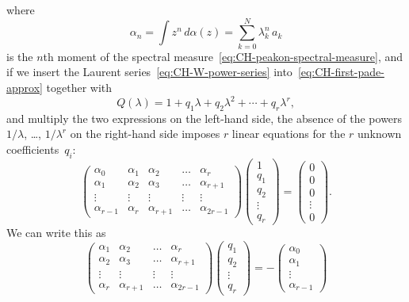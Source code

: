 \documentclass[10pt,a4paper]{article} \pdfoutput=1 
\begin{document}
where
\begin{equation}
  \label{eq:CH-def-moments}
  \alpha_n = \int z^n \, d\alpha(z)
  = \sum_{k=0}^N \lambda_k^n \, a_k
\end{equation}
is the $n$th moment of the spectral measure~\eqref{eq:CH-peakon-spectral-measure},
and if we insert the Laurent series~\eqref{eq:CH-W-power-series}
into~\eqref{eq:CH-first-pade-approx} together with
\begin{equation}
  Q(\lambda) = 1 + q_1 \lambda + q_2 \lambda^2 + \dotsb + q_r \lambda^r
  ,
\end{equation}
and multiply the two expressions on the left-hand side,
the absence of the powers
$1/\lambda$, \ldots, $1/\lambda^r$ on the right-hand side
imposes $r$ linear equations for the $r$ unknown coefficients~$q_i$:
\begin{equation}
  \label{eq:CH-stieltjes-orthogonality-matrix-form}
  \begin{pmatrix}
    \alpha_0 & \alpha_1 & \alpha_2 & \dots & \alpha_r \\
    \alpha_1 & \alpha_2 & \alpha_3 & \dots & \alpha_{r+1} \\
    \vdots & \vdots & \vdots & \vdots & \vdots \\
    \alpha_{r-1} & \alpha_r & \alpha_{r+1} & \dots & \alpha_{2r-1}
  \end{pmatrix}
  \begin{pmatrix}
    1 \\ q_1 \\ q_2 \\ \vdots \\ q_r
  \end{pmatrix}
  =
  \begin{pmatrix}
    0 \\ 0 \\ 0 \\ \vdots \\ 0
  \end{pmatrix}
  .
\end{equation}
We can write this as
\begin{equation*}
  \begin{pmatrix}
    \alpha_1 & \alpha_2 & \dots & \alpha_r \\
    \alpha_2 & \alpha_3 & \dots & \alpha_{r+1} \\
    \vdots & \vdots & \vdots & \vdots \\
    \alpha_r & \alpha_{r+1} & \dots & \alpha_{2r-1}
  \end{pmatrix}
  \begin{pmatrix}
    q_1 \\ q_2 \\ \vdots \\ q_r
  \end{pmatrix}
  =
  -
  \begin{pmatrix}
    \alpha_0 \\ \alpha_1 \\ \vdots \\ \alpha_{r-1}
  \end{pmatrix}
\end{equation*}
\end{document}
